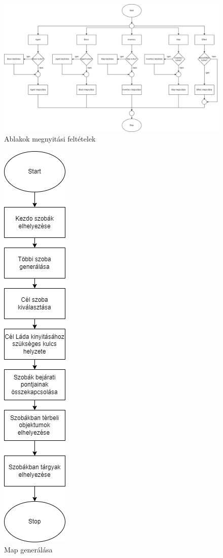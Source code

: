 \begin{figure}[!ht]
	\centering
	\includegraphics[scale=0.2]{images/uiopen.png}
	\caption{Ablakok megnyitási feltételek}
	\label{fig:Ablakok megnyitásaának feltételei}
\end{figure}

\begin{figure}[!ht]
	\centering
	\includegraphics[scale=0.2]{images/mapgen.png}
	\caption{Map generálása}
	\label{fig:Map generálás}
\end{figure}
